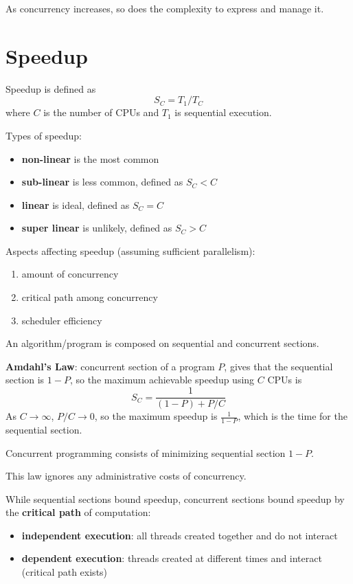 \documentclass[11pt]{article}
\begin{document}
As concurrency increases, so does the complexity to express and manage it.
\section{Speedup}
\label{sec:orgc8ea8bb}
Speedup is defined as
$$ S_{C} = T_{1}/T_{C} $$
where \(C\) is the number of CPUs and \(T_{1}\) is sequential execution.

Types of speedup:
\begin{itemize}
\item \textbf{non-linear} is the most common
\item \textbf{sub-linear} is less common, defined as \(S_{C} < C\)
\item \textbf{linear} is ideal, defined as \(S_{C} = C\)
\item \textbf{super linear} is unlikely, defined as \(S_{C} > C\)
\end{itemize}

Aspects affecting speedup (assuming sufficient parallelism):
\begin{enumerate}
\item amount of concurrency
\item critical path among concurrency
\item scheduler efficiency
\end{enumerate}

An algorithm/program is composed on sequential and concurrent sections.

\textbf{Amdahl's Law}: concurrent section of a program \(P\), gives that the sequential section is
\(1-P\), so the maximum achievable speedup using \(C\) CPUs is
$$ S_{C} = \frac{1}{(1-P) + P/C} $$
As \(C \to \infty\), \(P/C \to 0\), so the maximum speedup is \(\frac{1}{1-P}\), which is the time for the
sequential section.

Concurrent programming consists of minimizing sequential section \(1-P\).

This law ignores any administrative costs of concurrency.

While sequential sections bound speedup, concurrent sections bound speedup by the \textbf{critical path}
of computation:
\begin{itemize}
\item \textbf{independent execution}: all threads created together and do not interact
\item \textbf{dependent execution}: threads created at different times and interact (critical path exists)
\end{itemize}
\end{document}
